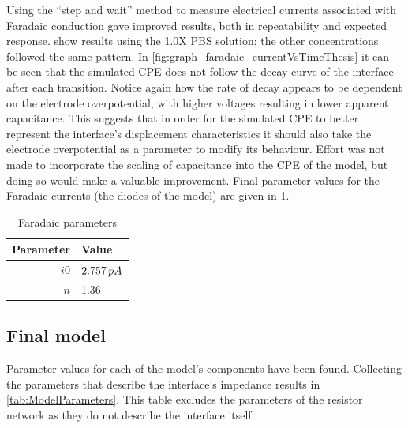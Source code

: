         Using the ``step and wait'' method to measure electrical currents associated with Faradaic conduction gave improved results, both in repeatability and expected response.
         show results using the 1.0X PBS solution; the other concentrations followed the same pattern.
        In \cref{fig:graph_faradaic_currentVsTimeThesis} it can be seen that the simulated CPE does not follow the decay curve of the interface after each transition.
        Notice again how the rate of decay appears to be dependent on the electrode overpotential, with higher voltages resulting in lower apparent capacitance.
        This suggests that in order for the simulated CPE to better represent the interface's displacement characteristics it should also take the electrode overpotential as a parameter to modify its behaviour.
        Effort was not made to incorporate the scaling of capacitance into the CPE of the model, but doing so would make a valuable improvement.
        Final parameter values for the Faradaic currents (the diodes of the model) are given in \cref{tab:FaradaicParams}.

        \begin{table}
          \caption{Faradaic parameters}
          \label{tab:FaradaicParams}
          \begin{center}
            \begin{tabular}{r | l}
                Parameter & Value \\
                \hline
                $i0$ & $2.757\thinspace pA$\\
                $n$ & 1.36\\
            \end{tabular}
          \end{center}
        \end{table}


    \subsection{Final model}


      Parameter values for each of the model's components have been found.
      Collecting the parameters that describe the interface's impedance results in \cref{tab:ModelParameters}.
      This table excludes the parameters of the resistor network as they do not describe the interface itself.

